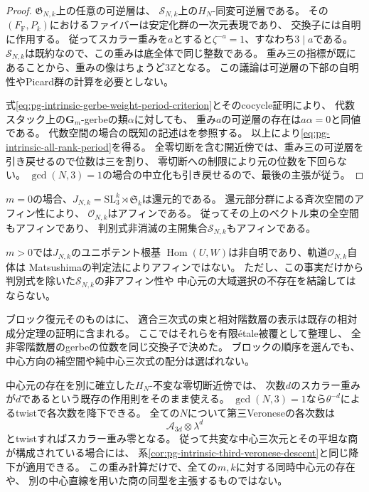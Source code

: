 \begin{proof}
$\mathfrak G_{N,k}$上の任意の可逆層は、
$\mathcal S_{N,k}$上の$H_N$-同変可逆層である。
その$(F_{\mathrm F},P_k)$におけるファイバーは安定化群の一次元表現であり、
交換子には自明に作用する。
従ってスカラー重みを$a$とすると$\zeta^{-a}=1$、すなわち$3\mid a$である。
$\mathcal S_{N,k}$は既約なので、この重みは底全体で同じ整数である。
重み三の指標が既にあることから、重みの像はちょうど$3\mathbb Z$となる。
この議論は可逆層の下部の自明性やPicard群の計算を必要としない。

式\eqref{eq:pg-intrinsic-gerbe-weight-period-criterion}とそのcocycle証明により、
代数スタック上の$\mathbf G_m$-gerbeの類$\alpha$に対しても、
重み$a$の可逆層の存在は$a\alpha=0$と同値である。
代数空間の場合の既知の記述は\cite[Lemma~3.1.1.8]{PLieblichPeriodIndex}を参照する。
以上により\eqref{eq:pg-intrinsic-all-rank-period}を得る。
全零切断を含む開近傍では、重み三の可逆層を引き戻せるので位数は三を割り、
零切断への制限により元の位数を下回らない。
$\gcd(N,3)=1$の場合の中立化も引き戻せるので、最後の主張が従う。
\end{proof}

\begin{remark}[満supportの場合のアフィン性]
\label{rem:pg-intrinsic-full-support-affinity}
$m=0$の場合、$J_{N,k}=\mathrm{SL}_3^k\rtimes\mathfrak S_k$は還元的である。
還元部分群による斉次空間のアフィン性\cite[Proposition~2.2, p.~2]{PArzhantsevMatsushima}により、
$\mathcal O_{N,k}$はアフィンである。
従ってその上のベクトル束の全空間もアフィンであり、
判別式非消滅の主開集合$\mathcal S_{N,k}$もアフィンである。

$m>0$では$J_{N,k}$のユニポテント根基
$\operatorname{Hom}(U,W)$は非自明であり、軌道$\mathcal O_{N,k}$自体は
Matsushimaの判定法\cite[Theorem~2.1, p.~2]{PArzhantsevMatsushima}によりアフィンではない。
ただし、この事実だけから判別式を除いた$\mathcal S_{N,k}$の非アフィン性や
中心元の大域選択の不存在を結論してはならない。
\end{remark}

\begin{remark}[既存結果との境界と中心元の降下]
\label{rem:pg-intrinsic-all-rank-descent-scope}
ブロック復元そのものは\cite[縮約二形式による復元補題]{PoissonCubic}に、
適合三次式の束と相対階数層の表示は既存の相対成分定理の証明に含まれる。
ここではそれらを有限\'etale被覆として整理し、
全非零階数層のgerbeの位数を同じ交換子で決めた。
ブロックの順序を選んでも、中心方向の補空間や純中心三次式の配分は選ばれない。

中心元の存在を別に確立した$H_N$-不変な零切断近傍では、
次数$d$のスカラー重みが$d$であるという既存の作用則をそのまま使える。
$\gcd(N,3)=1$なら$\theta^{-d}$によるtwistで各次数を降下できる。
全ての$N$について第三Veroneseの各次数は
\begin{equation}
 \mathcal A_{3d}\otimes\lambda^d
 \label{eq:pg-intrinsic-all-rank-third-veronese-weight}
\end{equation}
とtwistすればスカラー重み零となる。
従って共変な中心三次元とその平坦な商が構成されている場合には、
系\ref{cor:pg-intrinsic-third-veronese-descent}と同じ降下が適用できる。
この重み計算だけで、全ての$m,k$に対する同時中心元の存在や、
別の中心直線を用いた商の同型を主張するものではない。
\end{remark}

